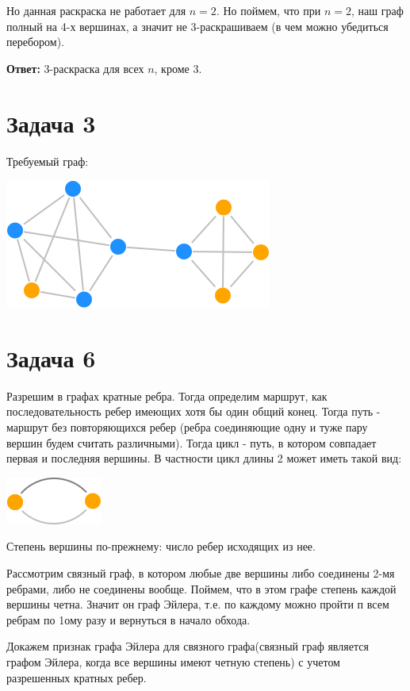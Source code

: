 \documentclass{article}
\begin{document}
	Но данная раскраска не работает для $n = 2$. Но поймем, что при $n = 2$, наш граф полный на 4-х вершинах, а значит не 3-раскрашиваем (в чем можно убедиться перебором).
	
	\textbf{Ответ:} 3-раскраска для всех $n$, кроме 3.
\section{Задача 3}

Требуемый граф:
\\
\begin{center}
\includegraphics[scale=0.5]{3_1}
\end{center}
\section{Задача 6}

Разрешим в графах кратные ребра. Тогда определим маршрут, как последовательность ребер имеющих хотя бы один общий конец. Тогда путь - маршрут без повторяющихся ребер (ребра соединяющие одну и туже пару вершин будем считать различными). Тогда цикл - путь, в котором совпадает первая и последняя вершины. В частности цикл длины 2 может иметь такой вид:
\\
\begin{center}
	\includegraphics[scale=0.6]{6_1}
\end{center}

Степень вершины по-прежнему: число ребер исходящих из нее.

Рассмотрим связный граф, в котором любые две вершины либо соединены 2-мя ребрами, либо не соединены вообще. Поймем, что в этом графе степень каждой вершины четна. Значит он граф Эйлера, т.е. по каждому можно пройти п всем ребрам по 1ому разу и вернуться в начало обхода.

Докажем признак графа Эйлера для связного графа(связный граф является графом Эйлера, когда все вершины имеют четную степень) с учетом разрешенных кратных ребер.
\end{document}
